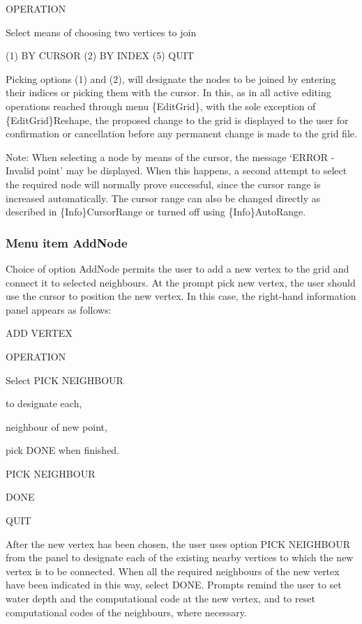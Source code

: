 \documentclass{article}
\begin{document}
OPERATION

Select means of choosing\newline
two vertices to join

(1) BY CURSOR\newline
(2) BY INDEX\newline
 \newline
(5) QUIT

Picking options (1) and (2), will designate the nodes to be joined by entering their indices or picking them with the cursor. In this, as in all active editing operations reached through menu \{EditGrid\}, with the sole exception of \{EditGrid\}Reshape, the proposed change to the grid is displayed to the user for confirmation or cancellation before any permanent change is made to the grid file.

Note: When selecting a node by means of the cursor, the message `ERROR - Invalid point' may be displayed. When this happens, a second attempt to select the required node will normally prove successful, since the cursor range is increased automatically. The cursor range can also be changed directly as described in \{Info\}CursorRange or turned off using \{Info\}AutoRange.

\subsubsection[Menu item AddNode]{Menu item AddNode}
Choice of option AddNode permits the user to add a new vertex to the grid and connect it to selected neighbours. At the prompt {\textquotedbl}pick new vertex{\textquotedbl}, the user should use the cursor to position the new vertex. In this case, the right-hand information panel appears as follows:

ADD VERTEX

OPERATION


\bigskip

Select PICK NEIGHBOUR 

to designate each, 

neighbour of new point, 

pick DONE when finished.\newline

PICK NEIGHBOUR \newline

DONE \newline

QUIT

After the new vertex has been chosen, the user uses option PICK NEIGHBOUR from the panel to designate each of the existing nearby vertices to which the new vertex is to be connected. When all the required neighbours of the new vertex have been indicated in this way, select DONE. Prompts remind the user to set water depth and the computational code at the new vertex, and to reset computational codes of the neighbours, where necessary.
\end{document}
